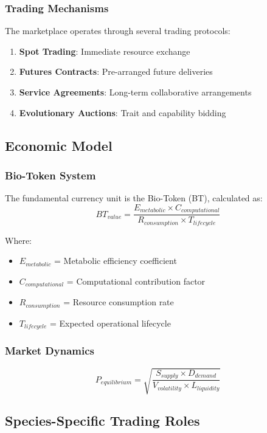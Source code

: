 \documentclass[11pt,a4paper]{article}
\begin{document}
\subsubsection{Trading Mechanisms}
The marketplace operates through several trading protocols:
\begin{enumerate}
    \item \textbf{Spot Trading}: Immediate resource exchange
    \item \textbf{Futures Contracts}: Pre-arranged future deliveries
    \item \textbf{Service Agreements}: Long-term collaborative arrangements
    \item \textbf{Evolutionary Auctions}: Trait and capability bidding
\end{enumerate}

\subsection{Economic Model}

\subsubsection{Bio-Token System}
The fundamental currency unit is the Bio-Token (BT), calculated as:
\begin{equation}
BT_{value} = \frac{E_{metabolic} \times C_{computational}}{R_{consumption} \times T_{lifecycle}}
\end{equation}

Where:
\begin{itemize}
    \item $E_{metabolic}$ = Metabolic efficiency coefficient
    \item $C_{computational}$ = Computational contribution factor
    \item $R_{consumption}$ = Resource consumption rate
    \item $T_{lifecycle}$ = Expected operational lifecycle
\end{itemize}

\subsubsection{Market Dynamics}
\begin{equation}
P_{equilibrium} = \sqrt{\frac{S_{supply} \times D_{demand}}{V_{volatility} \times L_{liquidity}}}
\end{equation}

\subsection{Species-Specific Trading Roles}
\end{document}
